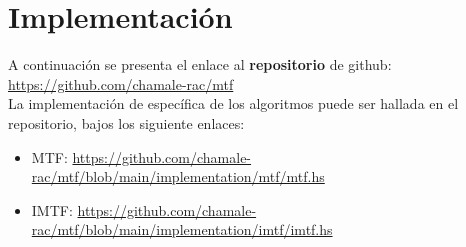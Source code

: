 \section*{Implementación}

A continuación se presenta el enlace al \textbf{repositorio} de github: \url{https://github.com/chamale-rac/mtf}\\

La implementación de específica de los algoritmos puede ser hallada en el repositorio, bajos los siguiente enlaces:

\begin{itemize}
    \item MTF: \url{https://github.com/chamale-rac/mtf/blob/main/implementation/mtf/mtf.hs}
    \item IMTF: \url{https://github.com/chamale-rac/mtf/blob/main/implementation/imtf/imtf.hs}
\end{itemize}
